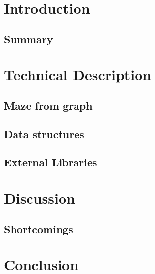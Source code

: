 \documentclass[12pt, a4paper]{article}
\begin{document}
\maketitle

\newpage


\tableofcontents


\newpage
\section{Introduction}
\subsection{Summary}

\newpage
\section{Technical Description}
\subsection{Maze from graph}
\subsection{Data structures}



\subsection{External Libraries}



\newpage
\section{Discussion}
\subsection{Shortcomings}



\newpage
\section{Conclusion}
\end{document}
